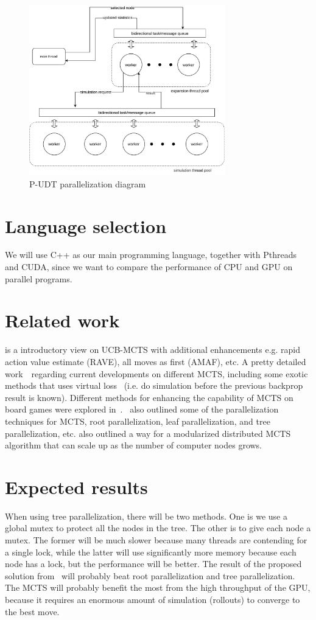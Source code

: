 \documentclass[sigconf]{acmart}
\begin{document}
\begin{figure}[h]
  \includegraphics[width=8.5cm]{P-UDT.pdf}
  \caption{P-UDT parallelization diagram}
\label{fig:P-UDT}
\end{figure}


\section{Language selection}
We will use C++ as our main programming language, together with Pthreads and CUDA, since we want to compare the performance of CPU and GPU on parallel programs. 

\section{Related work}
\cite{appplMCTS} is a introductory view on UCB-MCTS with additional enhancements e.g. rapid action value estimate (RAVE), all moves as first (AMAF), etc. A pretty detailed work~\cite{liu2020effective}~regarding current developments on different MCTS, including some exotic methods that uses virtual loss~\cite{Liu2020Watch} (i.e. do simulation before the previous backprop result is known). Different methods for enhancing the capability of MCTS on board games were explored in~\cite{weigel2017monte}.~\cite{guillaumeMCTS}\cite{weigel2017monte} also outlined some of the parallelization techniques for MCTS, root parallelization, leaf parallelization, and tree parallelization, etc. \cite{weigel2017monte} also outlined a way for a modularized distributed MCTS algorithm that can scale up as the number of computer nodes grows. 

\section{Expected results}
When using tree parallelization, there will be two methods. One is we use a global mutex to protect all the nodes in the tree. The other is to give each node a mutex. The former will be much slower because many threads are contending for a single lock, while the latter will use significantly more memory because each node has a lock, but the performance will be better. The result of the proposed solution from~\cite{Liu2020Watch} will probably beat root parallelization and tree parallelization. The MCTS will probably benefit the most from the high throughput of the GPU, because it requires an enormous amount of simulation (rollouts) to converge to the best move.
\end{document}
